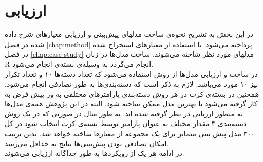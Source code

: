 \chapter{ارزیابی}
در این بخش به تشریح نحوه‌ی ساخت مدلهای پیش‌بینی و ارزیابی معیارهای شرح داده شده در فصل \ref{chap:method} پرداخته می‌شود. با استفاده از معیارهای استخراج شده در فصل \ref{chap:case-study} مدلهای مورد نظر شاخته می‌شوند. ساخت مدل‌ها در زبان R انجام می‌گردد به وسیله‌ی بسته‌ی  \cite{kuhn2008caret} انجام می‌شود.\\
در ساخت و ارزیابی مدل‌ها از روش  استفاده می‌شود که تعداد دسته‌ها ۱۰ و تعداد تکرار نیز ۱۰ مورد می‌باشد. لازم به ذکر است که دسته‌بندی‌ها به طور تصادفی انجام می‌شود.  همچنین در بسته‌ی کرت در هر روش دسته‌بندی پارامترهای مختلفی به ور پیش فرض به کار گرفته می‌شود تا بهترین مدل ممکن ساخته شود. البته در این پژوهش همه‌ی مدل‌ها به منظور ارزیابی در نظر گرفته شده اند. به طور مثال در صورتی که در یک روش دسته‌بندی ۳ مقدار مختلف به عنوان پارامتر توسط بسته‌ی کرت انتخاب شود در کل ۳۰۰ مدل پیش بینی متمایز برای یک مجموعه از معیارها ساخته  خواهد شد. بدین ترتیب امکان تصادفی بودن پیش‌بینی‌ها نتایج به حداقل می‌رسد.\\
در ادامه هر یک از رویکردها به طور جداگانه ارزیابی می‌شوند.


